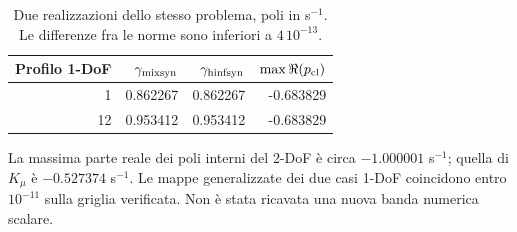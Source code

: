 \begin{table}[H]\centering\small
\begin{tabular}{rrrr}\toprule
Profilo 1-DoF & $\gamma_{\rm mixsyn}$ & $\gamma_{\rm hinfsyn}$ & $\max\Re(p_{\rm cl})$\\\midrule
1 & 0.862267 & 0.862267 & -0.683829 \\
12 & 0.953412 & 0.953412 & -0.683829 \\
\bottomrule\end{tabular}
\caption{Due realizzazioni dello stesso problema, poli in s$^{-1}$.
Le differenze fra le norme sono inferiori a $4\,10^{-13}$.}
\end{table}
La massima parte reale dei poli interni del 2-DoF è circa $-1.000001$
s$^{-1}$; quella di $K_\mu$ è $-0.527374$ s$^{-1}$.
Le mappe generalizzate dei due casi 1-DoF coincidono entro $10^{-11}$ sulla
griglia verificata. Non è stata ricavata una nuova banda numerica scalare.
